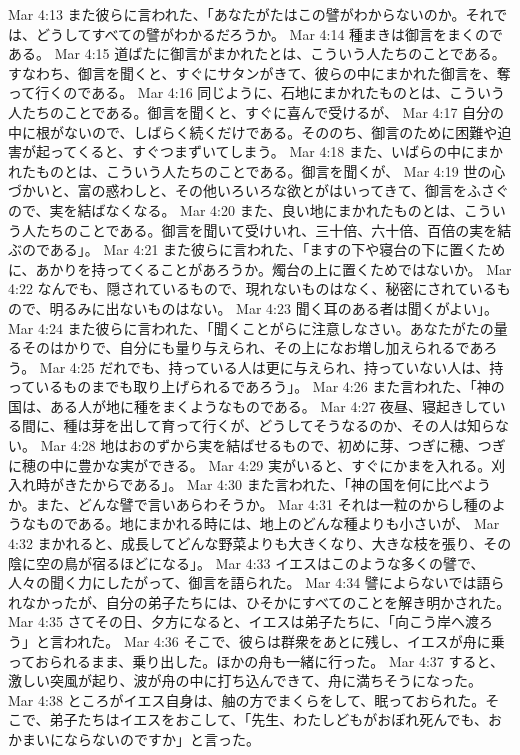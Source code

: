 Mar 4:13  また彼らに言われた、「あなたがたはこの譬がわからないのか。それでは、どうしてすべての譬がわかるだろうか。
Mar 4:14  種まきは御言をまくのである。
Mar 4:15  道ばたに御言がまかれたとは、こういう人たちのことである。すなわち、御言を聞くと、すぐにサタンがきて、彼らの中にまかれた御言を、奪って行くのである。
Mar 4:16  同じように、石地にまかれたものとは、こういう人たちのことである。御言を聞くと、すぐに喜んで受けるが、
Mar 4:17  自分の中に根がないので、しばらく続くだけである。そののち、御言のために困難や迫害が起ってくると、すぐつまずいてしまう。
Mar 4:18  また、いばらの中にまかれたものとは、こういう人たちのことである。御言を聞くが、
Mar 4:19  世の心づかいと、富の惑わしと、その他いろいろな欲とがはいってきて、御言をふさぐので、実を結ばなくなる。
Mar 4:20  また、良い地にまかれたものとは、こういう人たちのことである。御言を聞いて受けいれ、三十倍、六十倍、百倍の実を結ぶのである」。
Mar 4:21  また彼らに言われた、「ますの下や寝台の下に置くために、あかりを持ってくることがあろうか。燭台の上に置くためではないか。
Mar 4:22  なんでも、隠されているもので、現れないものはなく、秘密にされているもので、明るみに出ないものはない。
Mar 4:23  聞く耳のある者は聞くがよい」。
Mar 4:24  また彼らに言われた、「聞くことがらに注意しなさい。あなたがたの量るそのはかりで、自分にも量り与えられ、その上になお増し加えられるであろう。
Mar 4:25  だれでも、持っている人は更に与えられ、持っていない人は、持っているものまでも取り上げられるであろう」。
Mar 4:26  また言われた、「神の国は、ある人が地に種をまくようなものである。
Mar 4:27  夜昼、寝起きしている間に、種は芽を出して育って行くが、どうしてそうなるのか、その人は知らない。
Mar 4:28  地はおのずから実を結ばせるもので、初めに芽、つぎに穂、つぎに穂の中に豊かな実ができる。
Mar 4:29  実がいると、すぐにかまを入れる。刈入れ時がきたからである」。
Mar 4:30  また言われた、「神の国を何に比べようか。また、どんな譬で言いあらわそうか。
Mar 4:31  それは一粒のからし種のようなものである。地にまかれる時には、地上のどんな種よりも小さいが、
Mar 4:32  まかれると、成長してどんな野菜よりも大きくなり、大きな枝を張り、その陰に空の鳥が宿るほどになる」。
Mar 4:33  イエスはこのような多くの譬で、人々の聞く力にしたがって、御言を語られた。
Mar 4:34  譬によらないでは語られなかったが、自分の弟子たちには、ひそかにすべてのことを解き明かされた。
Mar 4:35  さてその日、夕方になると、イエスは弟子たちに、「向こう岸へ渡ろう」と言われた。
Mar 4:36  そこで、彼らは群衆をあとに残し、イエスが舟に乗っておられるまま、乗り出した。ほかの舟も一緒に行った。
Mar 4:37  すると、激しい突風が起り、波が舟の中に打ち込んできて、舟に満ちそうになった。
Mar 4:38  ところがイエス自身は、舳の方でまくらをして、眠っておられた。そこで、弟子たちはイエスをおこして、「先生、わたしどもがおぼれ死んでも、おかまいにならないのですか」と言った。
